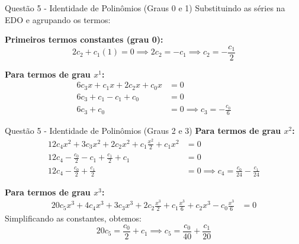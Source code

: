 \documentclass[8pt,aspectratio = 169]{beamer}
\begin{document}
\begin{frame}{Questão 5 - Identidade de Polinômios (Graus 0 e 1)}
    Substituindo as séries na EDO e agrupando os termos:
    
    \vspace{0.5cm}
    \textbf{Primeiros termos constantes (grau 0):}
    \begin{equation*}
        2c_2 + c_1(1) = 0 \implies 2c_2 = -c_1 \implies c_2 = -\frac{c_1}{2}
    \end{equation*}
    
    \vspace{0.5cm}
    \textbf{Para termos de grau $x^1$:}
    \begin{align*}
        6c_3 x + c_1 x + 2c_2 x + c_0 x &= 0 \\
        6c_3 + c_1 - c_1 + c_0 &= 0 \\
        6c_3 + c_0 &= 0 \implies c_3 = -\frac{c_0}{6}
    \end{align*}
\end{frame}

\begin{frame}{Questão 5 - Identidade de Polinômios (Graus 2 e 3)}
    \textbf{Para termos de grau $x^2$:}
    \begin{align*}
        12c_4 x^2 + 3c_3 x^2 + 2c_2 x^2 + c_1 \frac{x^2}{2} + c_1 x^2 &= 0 \\
        12c_4 - \frac{c_0}{2} - c_1 + \frac{c_1}{2} + c_1 &= 0 \\
        12c_4 - \frac{c_0}{2} + \frac{c_1}{2} &= 0 \implies c_4 = \frac{c_0}{24} - \frac{c_1}{24}
    \end{align*}
    
    \vspace{0.5cm}
    \textbf{Para termos de grau $x^3$:}
    \begin{align*}
        20c_5 x^3 + 4c_4 x^3 + 3c_3 x^3 + 2c_2 \frac{x^3}{2} + c_1 \frac{x^3}{6} + c_2 x^3 - c_0 \frac{x^3}{6} &= 0
    \end{align*}
    Simplificando as constantes, obtemos:
    \begin{equation*}
        20c_5 = \frac{c_0}{2} + c_1 \implies c_5 = \frac{c_0}{40} + \frac{c_1}{20}
    \end{equation*}
\end{frame}
\end{document}

